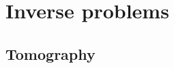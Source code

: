 \documentclass[doctor]{thesis}
\begin{document}

\chapter{Inverse problems}

\section{Tomography}
\label{sec:tomography}





%
%
%
%

%




\end{document}
